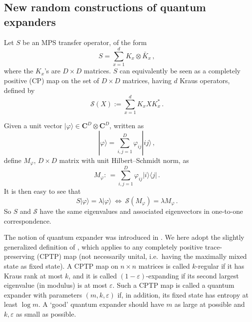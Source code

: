 \documentclass{amsart}
\newcommand{\C}{\mathbf{C}}
\newcommand{\ketbra}[2]{| #1 \rangle\!\langle #2 |}
\newcommand{\ket}[1]{| #1 \rangle}
\begin{document}
\subsection{New random constructions of quantum expanders} \hfill\par\smallskip
\label{sec:quantum-expander}

Let $S$ be an MPS transfer operator, of the form
\[ S=\sum_{x=1}^{d} K_x\otimes\bar{K}_x \, , \]
where the $K_x$'s are $D\times D$ matrices. $S$ can equivalently be seen as a completely positive (CP) map on the set of $D\times D$ matrices, having $d$ Kraus operators, defined by
\[ \mathcal{S}(X) := \sum_{x=1}^{d} K_x X K_x^* \, . \]

Given a unit vector $\ket{\varphi}\in\C^{D}\otimes\C^{D}$, written as
\[ \ket{\varphi} = \sum_{i,j=1}^{D}\varphi_{ij}\ket{ij} \, , \]
define $M_{\varphi}$, $D\times D$ matrix with unit Hilbert--Schmidt norm, as
\[ M_{\varphi}:\, = \sum_{i,j=1}^{D}\varphi_{ij}\ketbra{i}{j} \, . \]
It is then easy to see that
\[ S\ket{\varphi} = \lambda\ket{\varphi} \ \Longleftrightarrow\ \mathcal{S}(M_{\varphi}) = \lambda M_{\varphi} \, . \]
So $S$ and $\mathcal{S}$ have the same eigenvalues and associated eigenvectors in one-to-one correspondence.

The notion of quantum expander was introduced in \cite{BASTS}. We here adopt the slightly generalized definition of \cite{Has1}, which applies to any completely positive trace-preserving (CPTP) map (not necessarily unital, i.e.~having the maximally mixed state as fixed state). A CPTP map on $n\times n$ matrices is called $k$-regular if it has Kraus rank at most $k$, and it is called $(1-\varepsilon)$-expanding if its second largest eigenvalue (in modulus) is at most $\varepsilon$. Such a CPTP map is called a quantum expander with parameters $(m,k,\varepsilon)$ if, in addition, its fixed state has entropy at least $\log m$. A `good' quantum expander should have $m$ as large at possible and $k,\varepsilon$ as small as possible.
\end{document}
